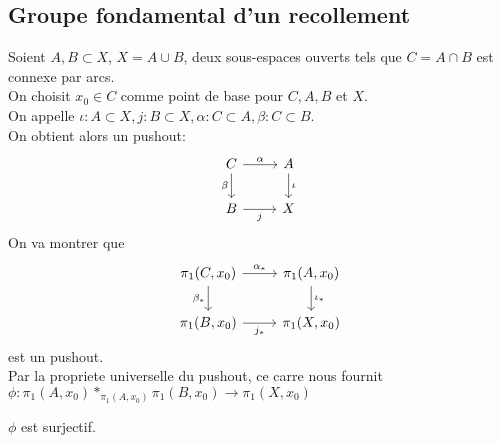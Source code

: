 \documentclass[../main.tex]{subfiles}
\begin{document}
\subsection{Groupe fondamental d'un recollement}
Soient $A,B \subset X$, $X= A \cup B$, deux sous-espaces ouverts tels que $C= A\cap B$ est connexe par arcs.\\
On choisit $x_0\in C$ comme point de base pour $C,A,B$ et $X$.\\
On appelle $\iota: A \subset X, j: B\subset X, \alpha:C \subset A, \beta: C \subset B$.\\
On obtient alors un pushout:
\[\begin{tikzcd}
	C & A \\
	B & X
	\arrow["\alpha", from=1-1, to=1-2]
	\arrow["\beta"', from=1-1, to=2-1]
	\arrow["j"', from=2-1, to=2-2]
	\arrow["\iota", from=1-2, to=2-2]
\end{tikzcd}\]
On va montrer que
\[\begin{tikzcd}
	{\pi_1(C,x_0)} & {\pi_1(A,x_0)} \\
	{\pi_1(B,x_0)} & {\pi_1(X,x_0)}
	\arrow["{\alpha_*}", from=1-1, to=1-2]
	\arrow["{\beta_*}"', from=1-1, to=2-1]
	\arrow["{j_*}"', from=2-1, to=2-2]
	\arrow["{\iota_*}", from=1-2, to=2-2]
\end{tikzcd}\]
est un pushout.\\
Par la propriete universelle du pushout, ce carre nous fournit $\phi:\pi_1( A,x_0) \ast_{ \pi_1( A,x_0) } \pi_1( B,x_0) \to \pi_1 ( X,x_0) $ 
\begin{lemma}
$\phi$ est surjectif.
\end{lemma}
\end{document}
